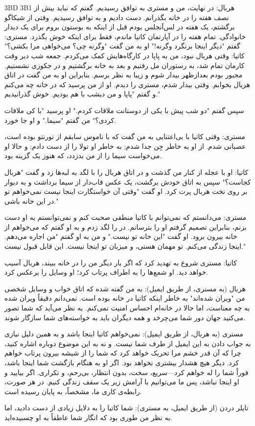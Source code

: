 3BD  
3B1  
هربال: در نهایت، من و مستری به توافق رسیدیم. گفتم که نباید بیش از نصف هفته را در خانه بگذرانم. دست دادیم و به توافق رسیدیم.  
وقتی از شیکاگو برگشتم، یک هفته در لس‌آنجلس بودم قبل از اینکه به بوستون بروم برای یک دیدار خانوادگی. تمام هفته را در آپارتمان کاتیا ماندم، فقط برای اینکه خوش بگذرد.  
مستری: گفتم "دیگر اینجا برنگرد وگرنه!"  
او به من گفت "وگرنه چی؟ می‌خواهی مرا بکشی؟"  
کاتیا: وقتی هربال نبود، من به پاپا در کارگاه‌هایش کمک می‌کردم. جمعه شب دیر وقت کارمان تمام شد، به رستوران مل رفتیم و بعد به خانه برگشتیم و در جکوزی نشستیم. مجبور بودم بعدازظهر بیدار شوم و زیبا به نظر برسم. بنابراین او به من گفت در اتاق هربال بخوابم. وقتی بیدار شدم، مستری را دیدم.  
او از من پرسید که در خانه چه می‌کنم و گفتم "پاپا و من دیشب با هم بودیم. خوش گذرانیدیم."  

سپس گفتم "دو شب پیش با یکی از دوستانت ملاقات کردم."  
او پرسید "با کی ملاقات کردی؟"  
من گفتم "سیما."  
و او جا خورد.  

مستری: وقتی کاتیا با بی‌اعتنایی به من گفت که با ناموس سابقم از تورنتو بوده است، عصبانی شدم. از او به خاطر جِن جدا شدم; به خاطر او تولا را از دست دادم; و حالا او می‌خواست سیما را از من بدزدد، که هنوز یک گزینه بود.  

کاتیا: او با عجله از کنار من گذشت و در اتاق هربال را با لگد به لبه‌ها زد و گفت "هربال کجاست؟" سپس به اتاق خودش برگشت، یک عکس قاب‌دار از سیما برداشت و به دیوار بر روی تخت هربال پرت کرد. او گفت "وقتی آن خواستگارت اینجا نیست نمی‌خواهم تو در این خانه باشی."  

مستری: می‌دانستم که نمی‌توانم با کاتیا منطقی صحبت کنم و نمی‌توانستم به او دست بزنم، بنابراین تصمیم گرفتم او را بترسانم. در را لگد زدم و به او گفتم که می‌خواهم از خانه بیرون برود. او گفت "این خانه تو نیست." و من به او گفتم "من اجاره می‌دهم. اینجا زندگی می‌کنم. تو مهمان هستی، و میزبان تو اینجا نیست. این قابل قبول نیست."  

کاتیا: مستری شروع به تهدید کرد که اگر بار دیگر من را در خانه ببیند، هربال آسیب خواهد دید. او شمع‌ها را به اطراف پرتاب کرد؛ او وسایل را برعکس کرد.  

هربال (به مستری، از طریق ایمیل): به من گفته شده که اتاق خواب و وسایل شخصی من "ویران شده‌اند" به خاطر اینکه کاتیا در خانه بوده است. نمی‌دانم دقیقاً ویران شده به چه معناست، اما حالا در خانه‌ام احساس امنیت نمی‌کنم. به نظر می‌آید که شما تصور می‌کنید جهان دور شما می‌چرخد و همه دیگران باید به خواسته‌های شما سازگار شوند.  

مستری (به هربال، از طریق ایمیل): نمی‌خواهم کاتیا اینجا باشد و به همین دلیل نیازی به جواب دادن به این ایمیل از طرف شما نیست. و نه به این موضوع دوباره اشاره کنید، چرا که آن قدر خشم مرا تحریک خواهد کرد که شما را از شیشه بیرون پرتاب خواهم کرد. دیگر هیچ هشدار بیشتری نخواهد بود. اگر او به هنگام بازگشت شما اینجا باشد، فوراً شما را له خواهم کرد—سریع، سخت، بدون انتظار، بی‌رحم، و تکراری. اگر بیایید و او اینجا نباشد، پس ما می‌توانیم با آرامش زیر یک سقف زندگی کنیم. در هر صورت، رابطه‌ی کاری ما، مشخصاً، به پایان رسیده است.  

تایلر دردن (از طریق ایمیل، به مستری): شما کاتیا را به دلایل زیادی از دست دادید، اما به نظر من طوری بود که انگار شما عاطفاً به او چسبیده‌اید.